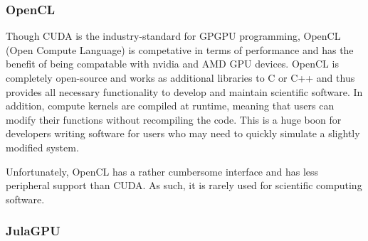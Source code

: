 \subsubsection{OpenCL}

Though CUDA is the industry-standard for GPGPU programming, OpenCL (Open Compute Language) is competative in terms of performance and has the benefit of being compatable with nvidia and AMD GPU devices.
OpenCL is completely open-source and works as additional libraries to C or C++ and thus provides all necessary functionality to develop and maintain scientific software.
In addition, compute kernels are compiled at runtime, meaning that users can modify their functions without recompiling the code.
This is a huge boon for developers writing software for users who may need to quickly simulate a slightly modified system.

Unfortunately, OpenCL has a rather cumbersome interface and has less peripheral support than CUDA.
As such, it is rarely used for scientific computing software.

\subsubsection{JulaGPU}
